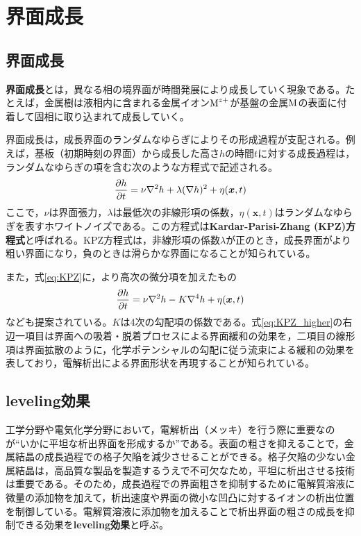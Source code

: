 \documentclass[autodetect-engine,dvi=dvipdfmx,a4paper,ja=standard,oneside,openany,11pt]{bxjsbook}
\begin{document}
\section{界面成長}
\subsection{界面成長}
\textbf{界面成長}とは，異なる相の境界面が時間発展により成長していく現象である。たとえば，金属樹は液相内に含まれる金属イオン$\ce{M^{z+}}$が基盤の金属$\ce{M}$の表面に付着して固相に取り込まれて成長していく。

界面成長は，成長界面のランダムなゆらぎによりその形成過程が支配される。例えば，基板（初期時刻の界面）から成長した高さ$h$の時間$t$に対する成長過程は，ランダムなゆらぎの項を含む次のような方程式で記述される\cite{kardar1987scaling}。
\begin{equation}
  \pdv{h}{t}=\nu\nabla^2h+\lambda(\nabla h)^2+\eta(\bm{x},t)
  \label{eq:KPZ}
\end{equation}
ここで，$\nu$は界面張力，$\lambda$は最低次の非線形項の係数，$\eta(\bm{x},t)$はランダムなゆらぎを表すホワイトノイズである。この方程式は\textbf{Kardar-Parisi-Zhang (KPZ)方程式}と呼ばれる。KPZ方程式は，非線形項の係数$\lambda$が正のとき，成長界面がより粗い界面になり，負のときは滑らかな界面になることが知られている。

また，式\eqref{eq:KPZ}に，より高次の微分項を加えたもの\cite{wolf1990growth}
\begin{equation}
  \pdv{h}{t}=\nu\nabla^2h-K\nabla^4h+\eta(\bm{x},t)
  \label{eq:KPZ_higher}
\end{equation}
なども提案されている。$K$は4次の勾配項の係数である。式\eqref{eq:KPZ_higher}の右辺一項目は界面への吸着・脱着プロセスによる界面緩和の効果を，二項目の線形項は界面拡散のように，化学ポテンシャルの勾配に従う流束による緩和の効果を表しており，電解析出による界面形状を再現することが知られている。

\subsection{leveling効果}
工学分野や電気化学分野において，電解析出（メッキ）を行う際に重要なのが``いかに平坦な析出界面を形成するか''である。表面の粗さを抑えることで，金属結晶の成長過程での格子欠陥を減少させることができる。格子欠陥の少ない金属結晶は，高品質な製品を製造するうえで不可欠なため，平坦に析出させる技術は重要である。そのため，成長過程での界面粗さを抑制するために電解質溶液に微量の添加物を加えて，析出速度や界面の微小な凹凸に対するイオンの析出位置を制御している。電解質溶液に添加物を加えることで析出界面の粗さの成長を抑制できる効果を\textbf{leveling効果}と呼ぶ。
\end{document}

